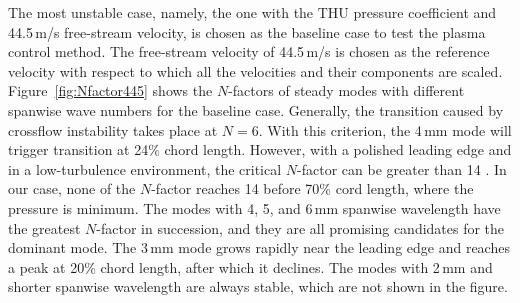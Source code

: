 The most unstable case, namely, the one with the THU pressure coefficient and 44.5\,m/s free-stream velocity, is chosen as the baseline case to test the plasma control method. The free-stream velocity of 44.5\,m/s is chosen as the reference velocity with respect to which  all the velocities and their components are  scaled. Figure~\ref{fig:Nfactor445} shows the $N$-factors of steady modes with different spanwise wave numbers for the baseline case. Generally, the transition caused by crossflow instability takes place at $N=6$. With this criterion, the 4\,mm mode will trigger transition at 24\% chord length. However, with a polished leading edge and in a low-turbulence environment, the critical $N$-factor can be greater than 14 \cite{saric2011}. In our case, none of the $N$-factor reaches 14 before 70\% cord length, where the pressure is minimum. The modes with 4, 5, and 6\,mm spanwise wavelength have the greatest $N$-factor in succession, and they are all promising candidates for the dominant mode. The 3\,mm mode grows rapidly near the leading edge and reaches a peak at 20\% chord length, after which it declines. The modes with 2\,mm and shorter spanwise wavelength are always stable, which are not shown in the figure. %

